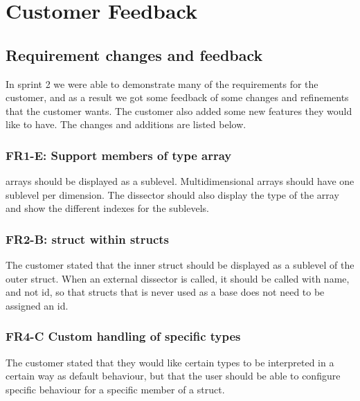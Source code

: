 \section{Customer Feedback}
\label{sec:sp2:feedback}
\subsection{Requirement changes and feedback}
In sprint 2 we were able to demonstrate many of the requirements for the customer, and as a result we got some feedback of some changes and refinements that the customer wants. The customer also added some new features they would like to have. The changes and additions are listed below.

\subsubsection{FR1-E: Support \glspl{member} of type \gls{array}}
\Glspl{array} should be displayed as a sublevel. Multidimensional \glspl{array} should have one sublevel per dimension. The \gls{dissector} should also display the type of the \gls{array} and show the different indexes for the sublevels.

\subsubsection{FR2-B: \gls{struct} within \glspl{struct}}
The customer stated that the inner \gls{struct} should be displayed as a sublevel of the outer \gls{struct}.
When an external \gls{dissector} is called, it should be called with name, and not id, so that \glspl{struct} that is never used as a base does not need to be assigned an id.

\subsubsection{FR4-C Custom handling of specific types}
The customer stated that they would like certain types to be interpreted in a certain way as default behaviour, but that the user should be able to configure specific behaviour for a specific \gls{member} of a \gls{struct}.

